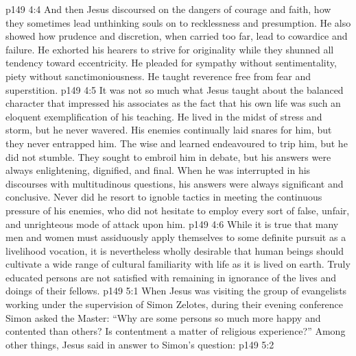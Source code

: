 \vs p149 4:4 And then Jesus discoursed on the dangers of courage and faith, how they sometimes lead unthinking souls on to recklessness and presumption. He also showed how prudence and discretion, when carried too far, lead to cowardice and failure. He exhorted his hearers to strive for originality while they shunned all tendency toward eccentricity. He pleaded for sympathy without sentimentality, piety without sanctimoniousness. He taught reverence free from fear and superstition.
\vs p149 4:5 It was not so much what Jesus taught about the balanced character that impressed his associates as the fact that his own life was such an eloquent exemplification of his teaching. He lived in the midst of stress and storm, but he never wavered. His enemies continually laid snares for him, but they never entrapped him. The wise and learned endeavoured to trip him, but he did not stumble. They sought to embroil him in debate, but his answers were always enlightening, dignified, and final. When he was interrupted in his discourses with multitudinous questions, his answers were always significant and conclusive. Never did he resort to ignoble tactics in meeting the continuous pressure of his enemies, who did not hesitate to employ every sort of false, unfair, and unrighteous mode of attack upon him.
\vs p149 4:6 While it is true that many men and women must assiduously apply themselves to some definite pursuit as a livelihood vocation, it is nevertheless wholly desirable that human beings should cultivate a wide range of cultural familiarity with life as it is lived on earth. Truly educated persons are not satisfied with remaining in ignorance of the lives and doings of their fellows.
\vs p149 5:1 When Jesus was visiting the group of evangelists working under the supervision of Simon Zelotes, during their evening conference Simon asked the Master: “Why are some persons so much more happy and contented than others? Is contentment a matter of religious experience?” Among other things, Jesus said in answer to Simon’s question:
\vs p149 5:2 \pc {}
